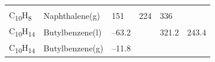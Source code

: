 \documentclass[
  9pt,
]{extbook}
\theoremstyle{definition}
\theoremstyle{definition}
\theoremstyle{definition}
\theoremstyle{remark}
\begin{document}
\begin{longtable}[]{@{}llllll@{}}
\begin{minipage}[t]{0.14\columnwidth}
\strut
\end{minipage}\tabularnewline
\begin{minipage}[t]{0.07\columnwidth}\raggedright
C\textsubscript{10}H\textsubscript{8}\strut
\end{minipage} & \begin{minipage}[t]{0.17\columnwidth}\raggedright
Naphthalene(g)\strut
\end{minipage} & \begin{minipage}[t]{0.15\columnwidth}\raggedright
151\strut
\end{minipage} & \begin{minipage}[t]{0.15\columnwidth}\raggedright
224\strut
\end{minipage} & \begin{minipage}[t]{0.14\columnwidth}\raggedright
336\strut
\end{minipage} & \begin{minipage}[t]{0.14\columnwidth}\raggedright
\strut
\end{minipage}\tabularnewline
\begin{minipage}[t]{0.07\columnwidth}\raggedright
C\textsubscript{10}H\textsubscript{14}\strut
\end{minipage} & \begin{minipage}[t]{0.17\columnwidth}\raggedright
Butylbenzene(l)\strut
\end{minipage} & \begin{minipage}[t]{0.15\columnwidth}\raggedright
--63.2\strut
\end{minipage} & \begin{minipage}[t]{0.15\columnwidth}\raggedright
\strut
\end{minipage} & \begin{minipage}[t]{0.14\columnwidth}\raggedright
321.2\strut
\end{minipage} & \begin{minipage}[t]{0.14\columnwidth}\raggedright
243.4\strut
\end{minipage}\tabularnewline
\begin{minipage}[t]{0.07\columnwidth}\raggedright
C\textsubscript{10}H\textsubscript{14}\strut
\end{minipage} & \begin{minipage}[t]{0.17\columnwidth}\raggedright
Butylbenzene(g)\strut
\end{minipage} & \begin{minipage}[t]{0.15\columnwidth}\raggedright
--11.8\strut
\end{minipage} & \begin{minipage}[t]{0.15\columnwidth}\raggedright

\end{minipage}
\end{longtable}
\end{document}
